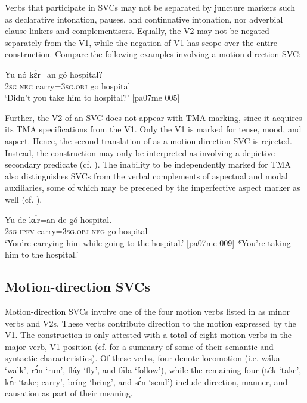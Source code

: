 Verbs that participate in SVCs may not be separated by juncture markers such as declarative intonation, pauses, and continuative intonation, nor adverbial clause linkers and complementisers. Equally, the V2 may not be negated separately from the V1, while the negation of V1 has scope over the entire construction. Compare the following examples involving a motion-direction SVC:



\z


\ea%
    \label{ex:key:1541}
    \gll Yu  nó  kɛ́r=an    gó  hospital?\\
\textsc{2sg}  \textsc{neg}  carry=\textsc{3sg.obj}  go  hospital\\
\glt ‘Didn’t you take him to hospital?’ [pa07me 005]
\z

Further, the V2 of an SVC does not appear with TMA marking, since it acquires its TMA specifications from the V1. Only the V1 is marked for tense, mood, and aspect. Hence, the second translation of  as a motion-direction SVC is rejected. Instead, the construction may only be interpreted as involving a depictive secondary predicate (cf. ). The inability to be independently marked for TMA also distinguishes SVCs from the verbal complements of aspectual and modal auxiliaries, some of which may be preceded by the imperfective aspect marker as well (cf. ). 


\ea%
    \label{ex:key:1542}
    \gll Yu  de  kɛ́r=an    de  gó  hospital.\\
\textsc{2sg}  \textsc{ipfv}  carry=\textsc{3sg.obj}  \textsc{neg}  go  hospital\\

\glt ‘You’re carrying him while going to the hospital.’ [pa07me 009]
*You’re taking him to the hospital.’
\z

\subsection{Motion-direction SVCs}\label{sec:11.2.1}

Motion-direction SVCs involve one of the four motion{\fff} verbs listed in  as minor verbs and V2s. These verbs contribute direction to the motion expressed by the V1. The construction is only attested with a total of eight motion verbs in the major verb, V1 position (cf.  for a summary of some of their semantic and syntactic characteristics). Of these verbs, four denote locomotion (i.e. wáka ‘walk’, rɔ́n ‘run’, fláy ‘fly’, and fála ‘follow’), while the remaining four (ték ‘take’, kɛ́r ‘take; carry’, bríng ‘bring’, and sɛ́n ‘send’) include direction, manner, and causation as part of their meaning. 


